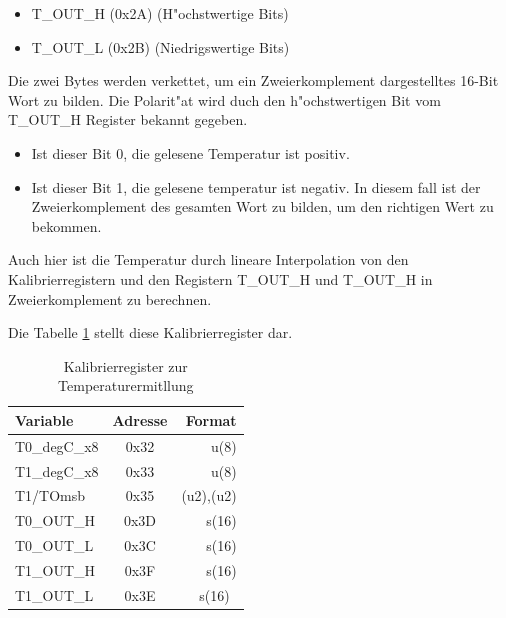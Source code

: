 \begin{itemize}
	\item T\_OUT\_H (0x2A) (H"ochstwertige Bits)
	\item T\_OUT\_L (0x2B) (Niedrigswertige Bits)
\end{itemize}

Die zwei Bytes werden verkettet, um ein Zweierkomplement dargestelltes 16-Bit Wort zu bilden. Die Polarit"at wird duch den h"ochstwertigen Bit vom T\_OUT\_H Register bekannt gegeben.

\begin{itemize}
	\item Ist dieser Bit 0, die gelesene Temperatur ist positiv.
	\item Ist dieser Bit 1, die gelesene temperatur ist negativ. In diesem fall ist der Zweierkomplement des gesamten Wort zu bilden, um den richtigen Wert zu bekommen.
\end{itemize}

\vspace{2cm}
Auch hier ist die Temperatur durch lineare Interpolation von den Kalibrierregistern und den Registern T\_OUT\_H und T\_OUT\_H in Zweierkomplement zu berechnen.

Die Tabelle \ref{tab:Reg_T} stellt diese Kalibrierregister dar.

\begin{center}
	\begin{table}[htbp] 
		\centering 
		\Large
		\begin{tabular}{l|c|r}
			\textbf{Variable} & 	\textbf{Adresse} & \textbf{Format} \\
			\hline
			T0\_degC\_x8	& 0x32	& u(8) \\
			\hline
			T1\_degC\_x8	& 0x33	& u(8)\\
			\hline
			T1/TOmsb & 0x35	& (u2),(u2)\\
			\hline
			T0\_OUT\_H 	& 0x3D  & s(16)\\
			\hline
			T0\_OUT\_L 	& 0x3C  & s(16)\\
			\hline
			T1\_OUT\_H	& 0x3F	& s(16)\\
			\hline
			T1\_OUT\_L 	& 0x3E  & s(16)\
		\end{tabular} 
		\caption{Kalibrierregister zur Temperaturermitllung} 
		\label{tab:Reg_T} 
		
	\end{table}
\end{center}

